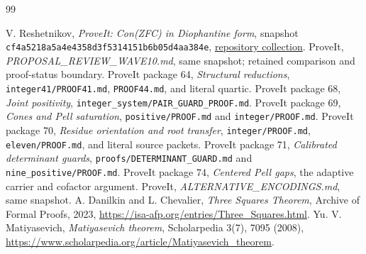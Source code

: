 \documentclass[11pt]{article}
\theoremstyle{remark}\newtheorem{remark}[theorem]{Remark}
\newcommand{\pin}{\texttt{cf4a5218a5a4e4358d3f5314151b6b05d4aa384e}}
\begin{document}
\begin{thebibliography}{99}
\raggedright
{} V. Reshetnikov, \emph{ProveIt: Con(ZFC) in Diophantine form},
  snapshot \pin, \href{https://github.com/VladimirReshetnikov/ProveIt/tree/cf4a5218a5a4e4358d3f5314151b6b05d4aa384e/Computability/DiophantineConsistency/con-zfc-diophantine-forms}{repository collection}.
 ProveIt, \emph{PROPOSAL\_REVIEW\_WAVE10.md}, same snapshot;
  retained comparison and proof-status boundary.
 ProveIt package 64, \emph{Structural reductions},
  \texttt{integer41/PROOF41.md}, \texttt{PROOF44.md}, and literal quartic.
 ProveIt package 68, \emph{Joint positivity},
  \texttt{integer\_system/PAIR\_GUARD\_PROOF.md}.
 ProveIt package 69, \emph{Cones and Pell saturation},
  \texttt{positive/PROOF.md} and \texttt{integer/PROOF.md}.
 ProveIt package 70, \emph{Residue orientation and root
  transfer}, \texttt{integer/PROOF.md}, \texttt{eleven/PROOF.md}, and
  literal source packets.
 ProveIt package 71, \emph{Calibrated determinant guards},
  \texttt{proofs/DETERMINANT\_GUARD.md} and
  \texttt{nine\_positive/PROOF.md}.
 ProveIt package 74, \emph{Centered Pell gaps},
  the adaptive carrier and cofactor argument.
 ProveIt, \emph{ALTERNATIVE\_ENCODINGS.md}, same snapshot.
 A. Danilkin and L. Chevalier,
  \emph{Three Squares Theorem}, Archive of Formal Proofs, 2023,
  \url{https://isa-afp.org/entries/Three_Squares.html}.
 Yu. V. Matiyasevich, \emph{Matiyasevich theorem},
  Scholarpedia 3(7), 7095 (2008),
  \url{https://www.scholarpedia.org/article/Matiyasevich_theorem}.
\end{thebibliography}
\end{document}
